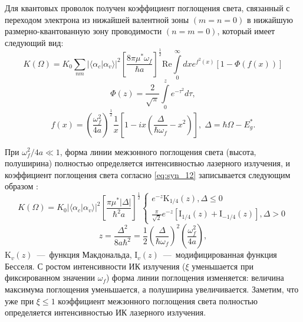 Для квантовых проволок получен коэффициент поглощения света, связанный с переходом электрона из нижайшей валентной зоны $(m=n=0)$ в нижайшую размерно-квантованную зону проводимости $(n=m=0)$, который имеет следующий вид:
\begin{equation} \label{eq:syn_12}
K\left(\Omega\right)=K_0\sum_{nm}{ {\lvert\langle \alpha_c | \alpha_v \rangle\rvert}^2 {\left[\frac{8\pi \mu^*\omega_f}{\hbar a}\right]}^{\frac{1}{2}} \mathrm{Re} \int\limits_0^\infty {dx e^{f^2\left(x\right)}\left[1-\Phi \left(f\left(x\right)\right)\right]}}
\end{equation}
\[
\Phi \left(z\right)=\frac{2}{\sqrt{\pi}}\int\limits_0^z {e^{-\tau^2}}d\tau ,
\] 
\[
f\left(x\right)={\left(\frac{\omega^2_f}{4a}\right)}^{\frac{1}{2}}\frac{1}{x}\left[1-ix\left(\frac{\Delta }{\hbar \omega_f}-x^2\right)\right],\; \Delta =\hbar \Omega-E^*_g .
\] 

При $\omega^2_f / 4a \ll 1$, форма линии межзонного поглощения света (высота, полуширина) полностью определяется интенсивностью лазерного излучения, и коэффициент поглощения света согласно \eqref{eq:syn_12} записывается следующим образом :
\begin{equation} \label{eq:syn_13}
K(\Omega)=K_0 {\lvert\langle \alpha_c | \alpha_v \rangle\rvert}^2
{\left[\frac{\pi {\mu }^*\left|\Delta \right|}{{\hbar }^2a}\right]}^{\frac{1}{2}}
\begin{cases}
e^{-z} \mathrm{K}_{1/4}(z), \Delta \le 0 \\ 
\frac{\pi }{\sqrt{2}}e^{-z}[\mathrm{I}_{{1}/{4}}\left(z\right)+\mathrm{I}_{-1/4}\left(z\right)], \Delta >0
\end{cases}
\end{equation}
\[
z=\frac{\Delta^2}{8a\hbar^2}=\frac{1}{2}\left(\frac{\Delta}{\hbar\omega_f} \right)^2 \left(\frac{\omega_f^2}{4a} \right),
\]
$\mathrm{K}_v\left(z\right)$~---~функция Макдональда, $\mathrm{I}_v\left(z\right)$~---~модифицированная функция Бесселя.
С ростом интенсивности ИК излучения ($\xi $ уменьшается при фиксированном значении $\omega_f$) форма линии поглощения изменяется: величина максимума поглощения уменьшается, а полуширина увеличивается. Заметим, что уже при $\xi \le 1$ коэффициент межзонного поглощения света полностью определяется интенсивностью ИК лазерного излучения.

